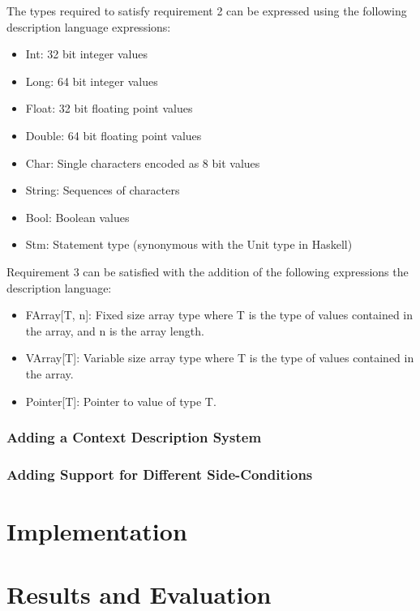 \documentclass{UoYCSproject}
\begin{document}
The types required to satisfy requirement 2 can be expressed using the following
description language expressions:
\begin{itemize}
    \item {\ttfamily Int}: 32 bit integer values
    \item {\ttfamily Long}: 64 bit integer values
    \item {\ttfamily Float}: 32 bit floating point values
    \item {\ttfamily Double}: 64 bit floating point values
    \item {\ttfamily Char}: Single characters encoded as 8 bit values
    \item {\ttfamily String}: Sequences of characters
    \item {\ttfamily Bool}: Boolean values
    \item {\ttfamily Stm}: Statement type (synonymous with the {\ttfamily Unit}
        type in Haskell)
\end{itemize}
Requirement 3 can be satisfied with the addition of the following expressions
the description language:
\begin{itemize}
    \item {\ttfamily FArray[T, n]}: Fixed size array type where {\ttfamily T} is 
        the type of values contained in the array, and {\ttfamily n} is the 
        array length.
    \item {\ttfamily VArray[T]}: Variable size array type where {\ttfamily T} is
        the type of values contained in the array.
    \item {\ttfamily Pointer[T]}: Pointer to value of type T.
\end{itemize}


\subsection{Adding a Context Description System}

\subsection{Adding Support for Different Side-Conditions}

\chapter{Implementation}

\chapter{Results and Evaluation}

\printbibliography
\end{document}

